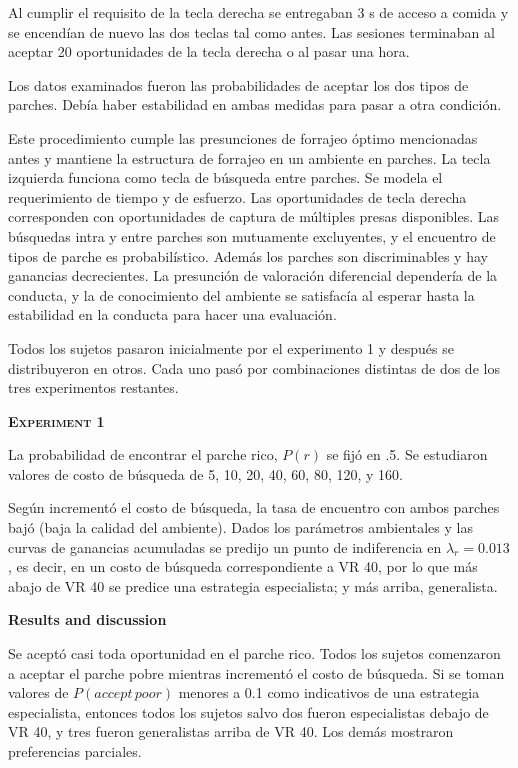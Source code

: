 \documentclass[a4paper,12pt]{article}
\begin{document}
Al cumplir el requisito de la tecla derecha se entregaban 3 s de acceso a comida y se encendían de nuevo las dos teclas tal como antes. Las sesiones terminaban al aceptar 20 oportunidades de la tecla derecha o al pasar una hora.

Los datos examinados fueron las probabilidades de aceptar los dos tipos de parches. Debía haber estabilidad en ambas medidas para pasar a otra condición.

Este procedimiento cumple las presunciones de forrajeo óptimo mencionadas antes y mantiene la estructura de forrajeo en un ambiente en parches. La tecla izquierda funciona como tecla de búsqueda entre parches. Se modela el requerimiento de tiempo y de esfuerzo. Las oportunidades de tecla derecha corresponden con oportunidades de captura de múltiples presas disponibles. Las búsquedas intra y entre parches son mutuamente excluyentes, y el encuentro de tipos de parche es probabilístico. Además los parches son discriminables y hay ganancias decrecientes. La presunción de valoración diferencial dependería de la conducta, y la de conocimiento del ambiente se satisfacía al esperar hasta la estabilidad en la conducta para hacer una evaluación.

Todos los sujetos pasaron inicialmente por el experimento 1 y después se distribuyeron en otros. Cada uno pasó por combinaciones distintas de dos de los tres experimentos restantes.

{\scshape\bfseries Experiment 1}

La probabilidad de encontrar el parche rico, $P(r)$ se fijó en .5. Se estudiaron valores de costo de búsqueda de 5, 10, 20, 40, 60, 80, 120, y 160.

Según incrementó el costo de búsqueda, la tasa de encuentro con ambos parches bajó (baja la calidad del ambiente). Dados los parámetros ambientales y las curvas de ganancias acumuladas se predijo un punto de indiferencia en $\lambda_{r} = 0{.}013$, es decir, en un costo de búsqueda correspondiente a VR 40, por lo que más abajo de VR 40 se predice una estrategia especialista; y más arriba, generalista.

{\bfseries Results and discussion}

Se aceptó casi toda oportunidad en el parche rico. Todos los sujetos comenzaron a aceptar el parche pobre mientras incrementó el costo de búsqueda. Si se toman valores de $P(accept\,poor)$ menores a 0.1 como indicativos de una estrategia especialista, entonces todos los sujetos salvo dos fueron especialistas debajo de VR 40, y tres fueron generalistas arriba de VR 40. Los demás mostraron preferencias parciales.
\end{document}
